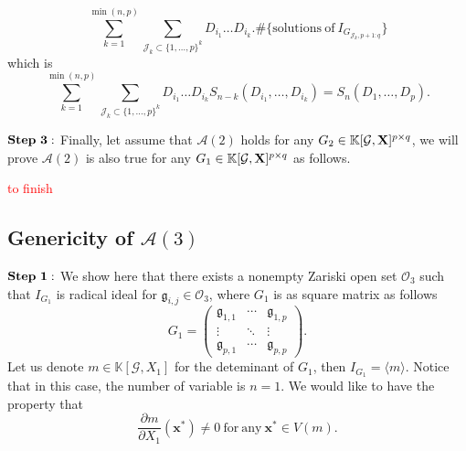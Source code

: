 \documentclass[11pt]{article}
\numberwithin{Property}{section}
\numberwithin{Theorem}{section}
\numberwithin{Proposition}{section}
\numberwithin{Lemma}{section}
\numberwithin{Corollary}{section}
\numberwithin{Definition}{section}
\numberwithin{Remark}{section}
\numberwithin{Conjecture}{section}
\numberwithin{Problem}{section}
\numberwithin{Example}{section}
\numberwithin{Claim}{section}
\newcommand{\field}{\mathbb{K}} %
\newcommand{\mat}[1]{\mathbf{\MakeUppercase{#1}}} %
\newcommand{\todo}[1]{\textcolor{red}{#1}} %
\begin{document}
\[\sum_{k=1}^{\min(n,p)} \sum_{\mathcal{J}_k \subset\{1, \ldots, p\}^k}D_{i_1} \ldots D_{i_k} . \# \{\mathrm{solutions \ of \ } I_{G_{\mathcal{J}_k, p+1:q}}\}\] which is 
\[
\sum_{k=1}^{\min(n,p)} \sum_{\mathcal{J}_k \subset\{1, \ldots, p\}^k}D_{i_1} \ldots D_{i_k}S_{n-k}(D_{i_1}, \ldots, D_{i_k}) = S_n(D_1, \ldots, D_p). 
\]

$\bf{Step \ 3:}$ Finally, let assume that $\mathcal{A}(2)$ holds for any $G_2 \in \field[\mathcal{G}, \mat{X}]^{p \times q}$, we will prove $\mathcal{A}(2)$ is also true for any $G_1 \in \field[\mathcal{G}, \mat{X}]^{p \times q}$ as follows.

\todo{to finish}
\subsection{Genericity of $\mathcal{A}(3)$} 
$\bf{Step \ 1:}$ We show here that there exists a nonempty Zariski open set $\mathcal{O}_3$ such that $I_{G_1}$ is radical ideal for $\mathfrak{g}_{i,j} \in \mathcal{O}_3$, where $G_1$ is as square matrix as follows 
\[
G_1 = \left( \begin{matrix}
\mathfrak{g}_{1,1}  & \cdots  & \mathfrak{g}_{1, p}\\
\vdots & \ddots & \vdots \\
\mathfrak{g}_{p,1} & \cdots  & \mathfrak{g}_{p, p}
\end{matrix} \right).
\] Let us denote $m \in \field[\mathcal{G}, X_1]$ for the deteminant of $G_1$, then $I_{G_1} = \langle m \rangle$. Notice that in this case, the number of variable is $n = 1$. We would like to have the property that \[\frac{\partial m}{\partial X_1}(\mathbf{x}^*) \ne 0 \ \mathrm{for \ any} \ \mathbf{x}^* \in V(m). \] 
\end{document}
